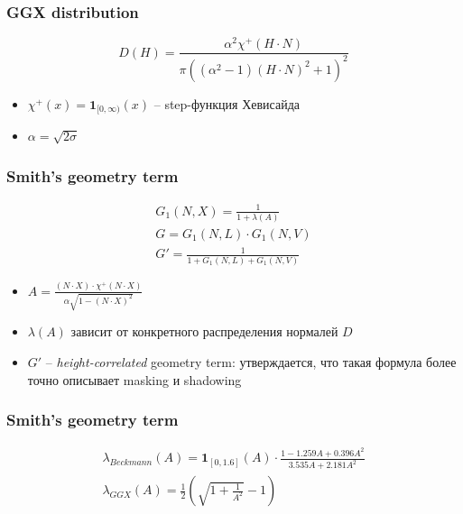 \documentclass[10pt]{beamer}
\begin{document}
\begin{frame}
\frametitle{GGX distribution}
\begin{equation*}
D(H) = \frac{\alpha^2\chi^+(H\cdot N)}{\pi\left((\alpha^2-1)(H\cdot N)^2 + 1\right)^2}
\end{equation*}
\begin{itemize}
\item \begin{math}\chi^+(x) = \mathbf 1_{[0, \infty)}(x)\end{math} -- step-функция Хевисайда
\item \begin{math}\alpha = \sqrt{2\sigma}\end{math}
\end{itemize}
\end{frame}

\begin{frame}
\frametitle{Smith's geometry term}
\begin{gather*}
G_1(N,X) = \frac{1}{1 + \lambda(A)} \\
G = G_1(N,L) \cdot G_1(N,V) \\
G' = \frac{1}{1 + G_1(N,L) + G_1(N,V)}
\end{gather*}
\begin{itemize}
\item \begin{math}A = \frac{(N\cdot X)\cdot\chi^+(N\cdot X)}{\alpha \sqrt{1 - (N\cdot X)^2}}\end{math}
\item \begin{math}\lambda(A)\end{math} зависит от конкретного распределения нормалей \begin{math}D\end{math}
\item \begin{math}G'\end{math} -- \textit{height-correlated} geometry term: утверждается, что такая формула более точно описывает masking и shadowing
\end{itemize}
\end{frame}

\begin{frame}
\frametitle{Smith's geometry term}
\begin{gather*}
\lambda_{Beckmann}(A) = \mathbf 1_{[0, 1.6]}(A) \cdot \frac{1 - 1.259 A + 0.396 A^2}{3.535 A + 2.181 A^2} \\
\lambda_{GGX}(A) = \frac{1}{2}\left(\sqrt{1 + \frac{1}{A^2}} - 1\right)
\end{gather*}
\end{frame}
\end{document}
